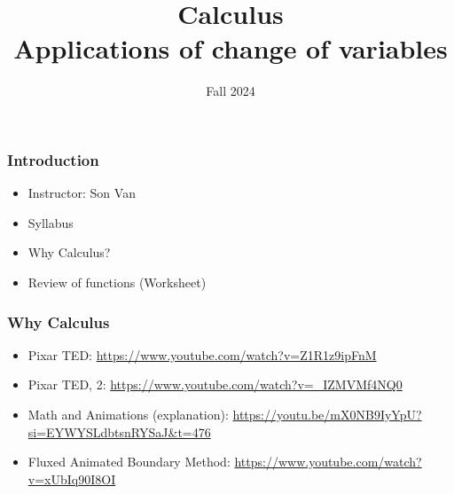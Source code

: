 \documentclass[aspectratio=169]{beamer}
\title{ Calculus  \\ Applications of change of variables }
\date{Fall 2024}
\begin{document}
\maketitle


\begin{frame}
	\frametitle{Introduction}
	\begin{itemize}
		\item Instructor: Son Van
		\item Syllabus
		\item Why Calculus?
		\item Review of functions (Worksheet)
	\end{itemize}
\end{frame}

\begin{frame}
	\frametitle{Why Calculus}
	\begin{itemize}
		\item Pixar TED: \url{https://www.youtube.com/watch?v=Z1R1z9ipFnM}
		\item Pixar TED, 2: \url{https://www.youtube.com/watch?v=_IZMVMf4NQ0}
		\item Math and Animations (explanation): \url{https://youtu.be/mX0NB9IyYpU?si=EYWYSLdbtsnRYSaJ&t=476}
		\item Fluxed Animated Boundary Method: \url{https://www.youtube.com/watch?v=xUbIq90I8OI}
	\end{itemize}


\end{frame}
\end{document}

